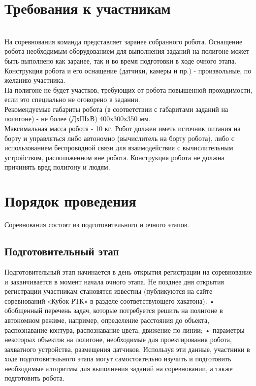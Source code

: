 \documentclass[12pt]{article}
\begin{document}
\section{Требования к участникам} \hspace*{1cm}
\\\hspace*{1cm}
На соревнования команда представляет заранее собранного робота. Оснащение робота необходимым оборудованием для выполнения заданий на полигоне может быть выполнено как заранее, так и во время подготовки в ходе очного этапа. Конструкция робота и его оснащение (датчики, камеры и пр.) - произвольные, по желанию участника. 
\\\hspace*{1cm}
На полигоне не будет участков, требующих от робота повышенной проходимости, если это специально не оговорено в задании.
\\\hspace*{1cm}
Рекомендуемые габариты робота (в соответствии с габаритами заданий на полигоне) - не более (ДхШхВ) 400х300х350 мм.
\\\hspace*{1cm}
Максимальная масса робота - 10 кг. Робот должен иметь источник питания на борту и управляться либо автономно (вычислитель на борту робота), либо с использованием беспроводной связи для взаимодействия с вычислительным устройством, расположенном вне робота. Конструкция робота не должна причинять вред полигону и людям.

\section{Порядок проведения} \hspace*{1cm}
Соревнования состоят из подготовительного и очного этапов.

\subsection{Подготовительный этап} \hspace*{1cm}
Подготовительный этап начинается в день открытия регистрации на соревнование и заканчивается в момент начала очного этапа.
Не позднее дня открытия регистрации участникам становятся известны (публикуются на сайте соревнований «Кубок РТК» в разделе соответствующего хакатона):
    •  обобщенный перечень задач, которые потребуется решить на полигоне в автономном режиме, например, определение расстояния до объекта, распознавание контура, распознавание цвета, движение по линии;
    •  параметры некоторых объектов на полигоне, необходимые для проектирования робота, захватного устройства, размещения датчиков.
Используя эти данные, участники в ходе подготовительного этапа могут самостоятельно изучить и подготовить необходимые алгоритмы для выполнения заданий на соревновании, а также подготовить робота.
\end{document}
